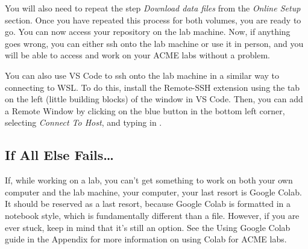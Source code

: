 You will also need to repeat the step \emph{Download data files} from the \emph{Online Setup} section.
Once you have repeated this process for both volumes, you are ready to go.
You can now access your repository on the lab machine.
Now, if anything goes wrong, you can either ssh onto the lab machine or use it in person, and you will be able to access and work on your ACME labs without a problem.

You can also use VS Code to ssh onto the lab machine in a similar way to connecting to WSL.
To do this, install the Remote-SSH extension using the  tab on the left (little building blocks) of the window in VS Code.
Then, you can add a Remote Window by clicking on the blue  button in the bottom left corner, selecting \emph{Connect To Host}, and typing in .
\fi

\subsection*{If All Else Fails\dots}
If, while working on a lab, you can't get something to work on 
\ifbyu
both your own computer and the lab machine,
\else 
your computer,
\fi
your last resort is Google Colab.
It should be reserved as a last resort, because Google Colab is formatted in a notebook style, which is fundamentally different than a  file.
However, if you are ever stuck, keep in mind that it's still an option.
See the Using Google Colab guide in the Appendix for more information on using Colab for ACME labs.
\fi


\ifbootcamp
